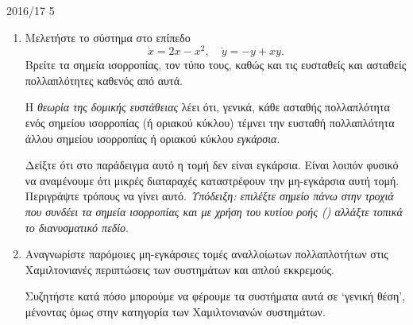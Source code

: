 \begin{exercise}{2016/17 5}
    \begin{enumerate}[label= (\alph*)]
        \item Μελετήστε το σύστημα στο επίπεδο
            \[
                \dot{x} = 2x - x^2, \quad \dot{y} = -y + xy.
            \]
            Βρείτε τα σημεία ισορροπίας, τον τύπο τους, καθώς και τις ευσταθείς
            και ασταθείς πολλαπλότητες καθενός από αυτά.

            Η \emph{θεωρία της δομικής ευστάθειας} λέει ότι, γενικά, κάθε ασταθής
            πολλαπλότητα ενός σημείου ισορροπίας (ή οριακού κύκλου) τέμνει την
            ευσταθή πολλαπλότητα άλλου σημείου ισορροπίας ή οριακού κύκλου
            \emph{εγκάρσια}.

            Δείξτε ότι στο παράδειγμα αυτό η τομή δεν είναι εγκάρσια. Είναι
            λοιπόν φυσικό να αναμένουμε ότι μικρές διαταραχές καταστρέφουν την
            μη-εγκάρσια αυτή τομή. Περιγράψτε τρόπους να γίνει αυτό.
            \emph{Υπόδειξη: επιλέξτε σημείο πάνω στην τροχιά που συνδέει τα
                σημεία ισορροπίας και με χρήση του κυτίου ροής ()
            αλλάξτε τοπικά το διανυσματικό πεδίο}.
        \item Αναγνωρίστε παρόμοιες μη-εγκάρσιες τομές αναλλοίωτων πολλαπλοτήτων
            στις Χαμιλτονιανές περιπτώσεις των συστημάτων  και απλού
            εκκρεμούς.

            Συζητήστε κατά πόσο μπορούμε να φέρουμε τα συστήματα αυτά σε
            \enquote*{γενική θέση}, μένοντας όμως στην κατηγορία των
            Χαμιλτονιανών συστημάτων.
    \end{enumerate}
\end{exercise}
